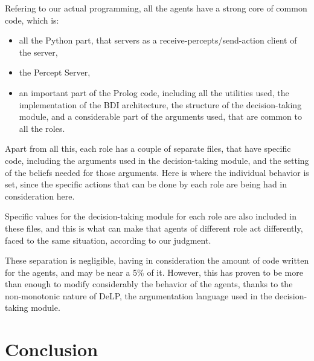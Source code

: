 \documentclass{llncs2e/llncs}
\begin{document}
    Refering to our actual programming, all the agents have a strong core of common
    code, which is:
    \begin{itemize}
        \item all the Python part, that servers as a receive-percepts/send-action client 
        of the server,
        
        \item the Percept Server,
        
        \item an important part of the Prolog code, including all the utilities used, the
        implementation of the BDI architecture, the structure of the 
        decision-taking module, and a considerable part of the arguments used, that
        are common to all the roles.
    \end{itemize}
    
    Apart from all this, each role has a couple of separate files, that have 
    specific code, including the arguments used in the decision-taking module, and
    the setting of the beliefs needed for those arguments. Here is where the 
    individual behavior is set, since the specific actions that can be done by each
    role are being had in consideration here.
    
    Specific values for the decision-taking module for each role are also included
    in these files, and this is what can make that agents of different role act 
    differently, faced to the same situation, according to our judgment.
    
    These separation is negligible, having in consideration the amount of code 
    written for the agents, and may be near a 5\% of it. However, this has proven to
    be more than enough to modify considerably the behavior of the agents, thanks to
    the non-monotonic nature of DeLP, the argumentation language used in the 
    decision-taking module.

\section{Conclusion}

    
\end{document}
